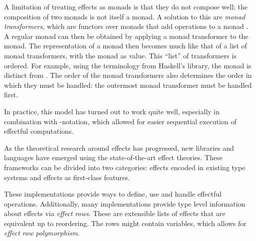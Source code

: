 A limitation of treating effects as monads is that they do not compose well; the composition of two monads is not itself a monad. A solution to this are \emph{monad transformers}, which are functors over monads that add operations to a monad \autocite{moggi_abstract_1989}. A regular monad can then be obtained by applying a monad transformer to the  monad. The representation of a monad then becomes much like that of a list of monad transformers, with the  monad as  value. This ``list'' of transformers is ordered. For example, using the terminology from Haskell's  library, the monad  is distinct from . The order of the monad transformers also determines the order in which they must be handled: the outermost monad transformer must be handled first.

In practice, this model has turned out to work quite well, especially in combination with -notation, which allowed for easier sequential execution of effectful computations.


As the theoretical research around effects has progressed, new libraries and languages have emerged using the state-of-the-art effect theories. These frameworks can be divided into two categories: effects encoded in existing type systems and effects as first-class features.

These implementations provide ways to define, use and handle effectful operations. Additionally, many implementations provide type level information about effects via \emph{effect rows}. These are extensible lists of effects that are equivalent up to reordering. The rows might contain variables, which allows for \emph{effect row polymorphism}.

